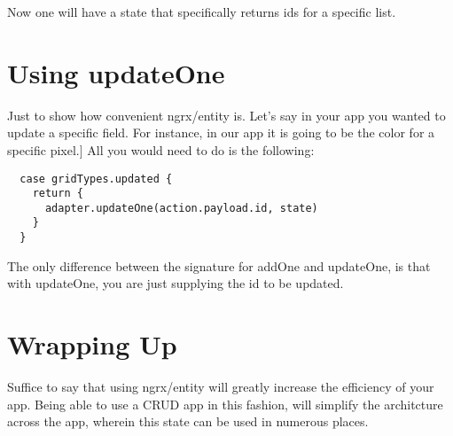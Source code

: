 Now one will have a state that specifically returns ids for a specific list.

\section{ Using updateOne }
Just to show how convenient ngrx/entity is. Let's say in your app you wanted to
update a specific field. For instance, in our app it is going to be the color
for a specific pixel.] All you would need to do is the following:
\begin{verbatim}
  case gridTypes.updated {
    return {
      adapter.updateOne(action.payload.id, state)
    }
  }
\end{verbatim}

The only difference between the signature for addOne and updateOne, is that with
updateOne, you are just supplying the id to be updated.

\section{ Wrapping Up }
Suffice to say that using ngrx/entity will greatly increase the efficiency of
your app. Being able to use a CRUD app in this fashion, will simplify the
architcture across the app, wherein this state can be used in numerous places.
